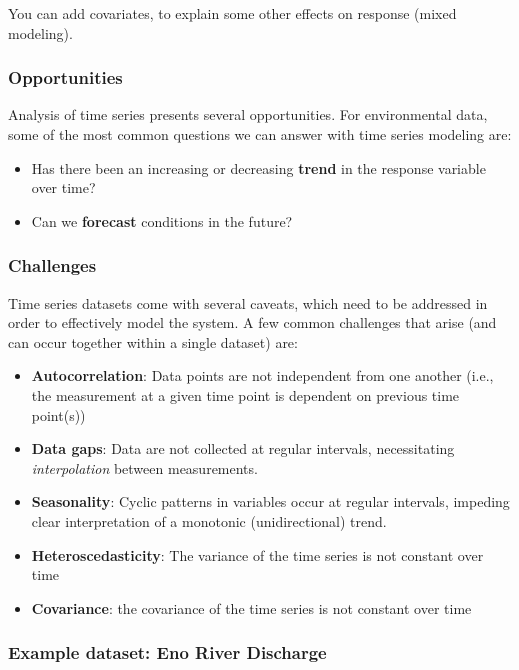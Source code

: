 \documentclass[
]{article}
\providecommand{\tightlist}{%
  \setlength{\itemsep}{0pt}\setlength{\parskip}{0pt}}
\begin{document}
You can add covariates, to explain some other effects on response (mixed
modeling).

\hypertarget{opportunities}{%
\subsubsection{Opportunities}\label{opportunities}}

Analysis of time series presents several opportunities. For
environmental data, some of the most common questions we can answer with
time series modeling are:

\begin{itemize}
\tightlist
\item
  Has there been an increasing or decreasing \textbf{trend} in the
  response variable over time?
\item
  Can we \textbf{forecast} conditions in the future?
\end{itemize}

\hypertarget{challenges}{%
\subsubsection{Challenges}\label{challenges}}

Time series datasets come with several caveats, which need to be
addressed in order to effectively model the system. A few common
challenges that arise (and can occur together within a single dataset)
are:

\begin{itemize}
\tightlist
\item
  \textbf{Autocorrelation}: Data points are not independent from one
  another (i.e., the measurement at a given time point is dependent on
  previous time point(s))
\item
  \textbf{Data gaps}: Data are not collected at regular intervals,
  necessitating \emph{interpolation} between measurements.
\item
  \textbf{Seasonality}: Cyclic patterns in variables occur at regular
  intervals, impeding clear interpretation of a monotonic
  (unidirectional) trend.
\item
  \textbf{Heteroscedasticity}: The variance of the time series is not
  constant over time
\item
  \textbf{Covariance}: the covariance of the time series is not constant
  over time
\end{itemize}

\hypertarget{example-dataset-eno-river-discharge}{%
\subsubsection{Example dataset: Eno River
Discharge}\label{example-dataset-eno-river-discharge}}
\end{document}
